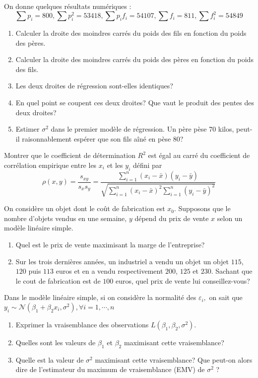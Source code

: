 \documentclass{td_um}
\providecommand{\1}{\mathds{1}}
\begin{document}
On donne quelques résultats numériques :
$$
\sum p_{i}=800, \sum p_{i}^{2}=53418, \sum p_{i} f_{i}=54107, \sum f_{i}=811, \sum f_{i}^{2}=54849
$$
\begin{enumerate}
    \item  Calculer la droite des moindres carrés du poids des fils en fonction du poids des pères.
    \item  Calculer la droite des moindres carrés du poids des pères en fonction du poids des fils.
    \item  Les deux droites de régression sont-elles identiques?
    \item  En quel point se coupent ces deux droites? Que vaut le produit des pentes des deux droites?
    \item  Estimer $\sigma^{2}$ dans le premier modèle de régression. Un père pèse 70 kilos, peut-il raisonnablement espérer que son fils aîné en pèse $80$?
\end{enumerate}

\exo{}
Montrer que le coefficient de détermination $R^{2}$ est égal au carré du coefficient de corrélation empirique entre les $x_{i}$ et les $y_{i}$ défini par
\[
\rho(x, y)=\frac{s_{x y}}{s_{x} s_{y}}=\frac{\sum_{i=1}^{n}\left(x_{i}-\bar{x}\right)\left(y_{i}-\bar{y}\right)}{\sqrt{\sum_{i=1}^{n}\left(x_{i}-\bar{x}\right)^{2} \sum_{i=1}^{n}\left(y_{i}-\bar{y}\right)^{2}}}
\]

\exo{}
On considère un objet dont le coût de fabrication est $x_{0}$. Supposons que le nombre d'objets vendus en une semaine, $y$ dépend du prix de vente $x$ selon un modèle linéaire simple.
\begin{enumerate}
    \item  Quel est le prix de vente maximisant la marge de l'entreprise?
    \item  Sur les trois dernières années, un industriel a vendu un objet un objet $115$, $120$ puis $113$ euros et en a vendu respectivement $200$, $125$ et $230$. Sachant que le cout de fabrication est de $100$ euros, quel prix de vente lui conseillez-vous?
\end{enumerate}

\exo{}
Dans le modèle linéaire simple, si on considère la normalité des $\varepsilon_{i},$ on sait que $y_{i} \sim \mathcal{N}\left(\beta_{1}+\beta_{2} x_{i}, \sigma^{2}\right), \forall i=1, \cdots, n$
\begin{enumerate}
    \item  Exprimer la vraisemblance des observations $L\left(\beta_{1}, \beta_{2}, \sigma^{2}\right)$.
    \item  Quelles sont les valeurs de $\beta_{1}$ et $\beta_{2}$ maximisant cette vraisemblance?
    \item  Quelle est la valeur de $\sigma^{2}$ maximisant cette vraisemblance? Que peut-on alors dire de l'estimateur du maximum de vraisemblance (EMV) de $\sigma^{2}$ ?
\end{enumerate}
\end{document}
